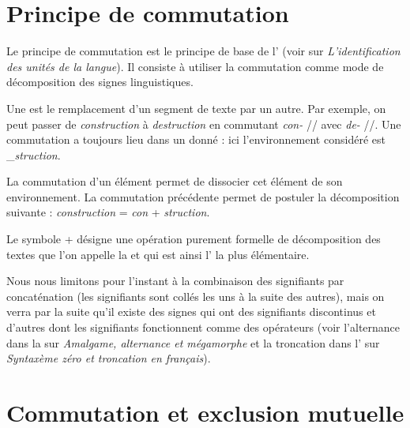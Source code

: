 \section{Principe de commutation}\label{sec:2.2.0}

Le principe de commutation est le principe de base de l’ (voir  sur \textit{L’identification des unités de la langue}). Il consiste à utiliser la commutation comme mode de décomposition des signes linguistiques.

\begin{styleLivreImportant}
Une  est le remplacement d’un segment de texte par un autre. Par exemple, on peut passer de \textit{construction} à \textit{destruction} en commutant \textit{con-} // avec \textit{de-} //. Une commutation a toujours lieu dans un  donné : ici l’environnement considéré est {\longrule}\_\textit{struction}.
\end{styleLivreImportant}

La commutation d’un élément permet de dissocier cet élément de son environnement. La commutation précédente permet de postuler la décomposition suivante : \textit{construction} = \textit{con} + \textit{struction}.

\begin{styleLivreImportant}
Le symbole + désigne une opération purement formelle de décomposition des textes que l’on appelle la  et qui est ainsi l’ la plus élémentaire.
\end{styleLivreImportant}

Nous nous limitons pour l’instant à la combinaison des signifiants par concaténation (les signifiants sont collés les uns à la suite des autres), mais on verra par la suite qu’il existe des signes qui ont des signifiants discontinus et d’autres dont les signifiants fonctionnent comme des opérateurs (voir l’alternance dans la  sur \textit{Amalgame, alternance et mégamorphe} et la troncation dans l’ sur \textit{Syntaxème zéro et troncation en français}).

\section{Commutation et exclusion mutuelle}\label{sec:2.2.1}

